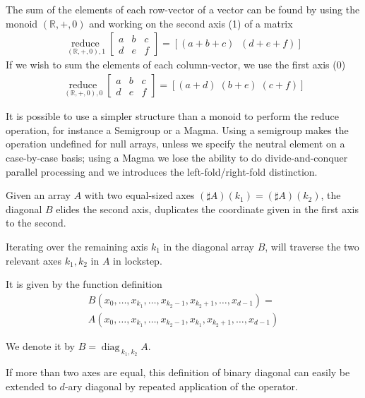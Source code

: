 \documentclass{DIKU-report-variant}
\newcommand\mrm[1]{\mathrm{#1}}
\newcommand\brm[1]{\bm{\mrm{#1}}}
\newcommand\Real{\mathbb{R}}
\newcommand\reduce{\operatorname*{\brm{reduce}\,}}
\newcommand\diag{\operatorname*{\brm{diag}\,}}
\begin{document}
\begin{example}
  \label{ex:reduce}
  The sum of the elements of each row-vector of a vector can be found by using the monoid \((\Real, +, 0)\)
  and working on the second axis (1) of a matrix
  \begin{align*}
    \reduce_{(\Real, +, 0), 1} \begin{bmatrix}
      a & b & c \\
      d & e & f
    \end{bmatrix} = [(a + b + c)\;\;(d + e + f)]
  \end{align*}
  If we wish to sum the elements of each column-vector, we use the first axis (0)
  \begin{align*}
    \reduce_{(\Real, +, 0), 0} \begin{bmatrix}
      a & b & c \\
      d & e & f
    \end{bmatrix} = [(a + d)\;(b + e)\;(c + f)]
  \end{align*}
\end{example}

\begin{remark}
  \label{rem:reduce}
  It is possible to use a simpler structure than a monoid to perform
  the reduce operation, for instance a Semigroup or a Magma. Using a semigroup
  makes the operation undefined for null arrays, unless we specify the neutral element
  on a case-by-case basis; using a Magma we lose the ability to do divide-and-conquer
  parallel processing and we introduces the left-fold/right-fold distinction.
\end{remark}

\begin{definition}
  \label{def:diagonal}
  Given an array \(A\) with two equal-sized axes \((\sharp A)(k_1) = (\sharp A)(k_2)\),
  the diagonal \(B\) elides the second axis, duplicates the coordinate given in the first
  axis to the second.

  Iterating over the remaining axis \(k_1\) in the diagonal array \(B\), will traverse the two relevant
  axes \(k_1,k_2\) in \(A\) in lockstep.

  It is given by the function definition
  \begin{align*}
    B(x_0, \dots, x_{k_1}, \dots, x_{k_2 - 1}, x_{k_2 + 1}, \dots, x_{d-1}) = \\
    A(x_0, \dots, x_{k_1}, \dots, x_{k_2 - 1}, x_{k_1}, x_{k_2 + 1}, \dots, x_{d-1})
  \end{align*}

  We denote it by \(B = \diag_{k_1,k_2} A\).

  If more than two axes are equal, this definition of binary diagonal can easily be extended to
  \(d\)-ary diagonal by repeated application of the operator.
\end{definition}
\end{document}
